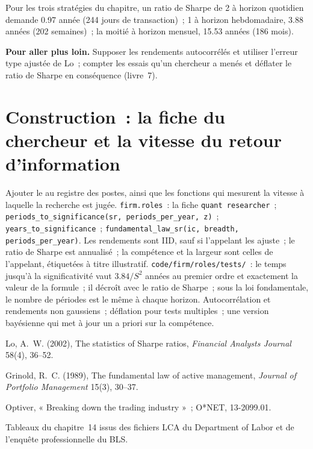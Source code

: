 Pour les trois stratégies du chapitre, un ratio de Sharpe de 2 à horizon quotidien demande 0.97 année (244 jours de transaction)~; 1 à horizon
hebdomadaire, 3.88 années (202 semaines)~; la moitié à horizon mensuel, 15.53 années (186 mois).

\textbf{Pour aller plus loin.} Supposer les rendements autocorrélés et utiliser l'erreur type ajustée de Lo~; compter les essais qu'un
chercheur a menés et déflater le ratio de Sharpe en conséquence (livre~7).

\section{Construction~: la fiche du chercheur et la vitesse du retour d'information}\label{bld:in:quant-researcher:roles}

\begin{build}
 Ajouter le  au registre des postes, ainsi que les fonctions qui mesurent la vitesse à laquelle la recherche
est jugée.
 \texttt{firm.roles}~: la fiche \texttt{quant researcher}~;
\texttt{periods\_to\_significance(sr, periods\_per\_year, z)}~; \texttt{years\_to\_significance}~;
\texttt{fundamental\_law\_sr(ic, breadth, periods\_per\_year)}.
 Les rendements sont IID, sauf si l'appelant les ajuste~; le ratio de Sharpe est annualisé~; la compétence et la largeur sont celles de l'appelant,
étiquetées à titre illustratif.
 \texttt{code/firm/roles/tests/}~: le temps jusqu'à la significativité vaut $3.84/S^2$ années au premier ordre et
exactement la valeur de la formule~; il décroît avec le ratio de Sharpe~; sous la loi fondamentale, le nombre de périodes est le même à
chaque horizon.
 Autocorrélation et rendements non gaussiens~; déflation pour tests multiples~; une version bayésienne qui met à jour
un a priori sur la compétence.
\end{build}

\begin{omsources}
\item Lo, A.~W. (2002), The statistics of Sharpe ratios, \emph{Financial Analysts Journal} 58(4), 36--52.
\item Grinold, R.~C. (1989), The fundamental law of active management, \emph{Journal of Portfolio Management} 15(3), 30--37.
\item Optiver, « Breaking down the trading industry »~; O*NET, 13-2099.01.
\item Tableaux du chapitre~14 issus des fichiers LCA du Department of Labor et de l'enquête professionnelle du BLS.
\end{omsources}

